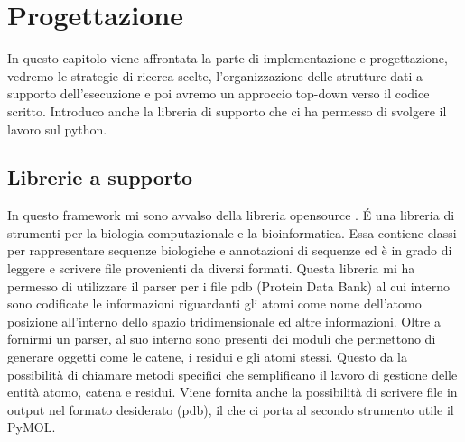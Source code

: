 \chapter{Progettazione}\label{chapter:progettazione}

In questo capitolo viene affrontata la parte di implementazione e progettazione, vedremo le strategie di ricerca scelte, l'organizzazione delle strutture dati a supporto dell'esecuzione e poi avremo un approccio top-down verso il codice scritto. Introduco anche la libreria di supporto che ci ha permesso di svolgere il lavoro sul python.

\section{Librerie a supporto}\label{sec:libreriesupporto}  
In questo framework mi sono avvalso della libreria opensource \cite{BioPythonManual}. É una libreria di strumenti per la biologia computazionale e la bioinformatica. Essa contiene classi per rappresentare sequenze biologiche e annotazioni di sequenze ed è in grado di leggere e scrivere file provenienti da diversi formati. 
Questa libreria mi ha permesso di utilizzare il parser per i file pdb (Protein Data Bank) al cui interno sono codificate le informazioni riguardanti gli atomi come nome dell'atomo posizione all'interno dello spazio tridimensionale ed altre informazioni. Oltre a fornirmi un parser, al suo interno sono presenti dei moduli che permettono di generare oggetti come le catene, i residui e gli atomi stessi.
Questo da la possibilità di chiamare metodi specifici che semplificano il lavoro di gestione delle entità atomo, catena e residui. Viene fornita anche la possibilità di scrivere file in output nel formato desiderato (pdb), il che ci porta al secondo strumento utile il PyMOL. 

